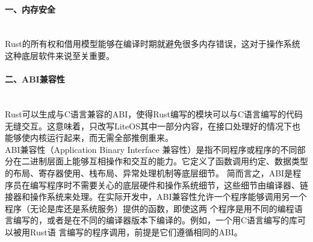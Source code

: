 \documentclass{ctexart}
\begin{document}
\paragraph{一、内存安全}\ \\
\indent Rust的所有权和借用模型能够在编译时期就避免很多内存错误，这对于操作系统这种底层软件来说至关重要。
\paragraph{二、ABI兼容性}\ \\
\indent Rust可以生成与C语言兼容的ABI，使得Rust编写的模块可以与C语言编写的代码无缝交互。这意味着，只改写LiteOS其中一部分内容，在接口处理好的情况下也能够使内核运行起来，而无需全部推倒重来。\\
\indent ABI兼容性（Application Binary Interface 兼容性）是指不同程序或程序的不同部分在二进制层面上能够互相操作和交互的能力。它定义了函数调用约定、数据类型的布局、寄存器使用、栈布局、异常处理机制等底层细节。
\indent 简而言之，ABI是程序员在编写程序时不需要关心的底层硬件和操作系统细节，这些细节由编译器、链接器和操作系统来处理。在实际开发中，ABI兼容性允许一个程序能够调用另一个程序（无论是库还是系统服务）提供的函数，即使这两
个程序是用不同的编程语言编写的，或者是在不同的编译器版本下编译的。例如，一个用C语言编写的库可以被用Rust语
言编写的程序调用，前提是它们遵循相同的ABI。
\end{document}
